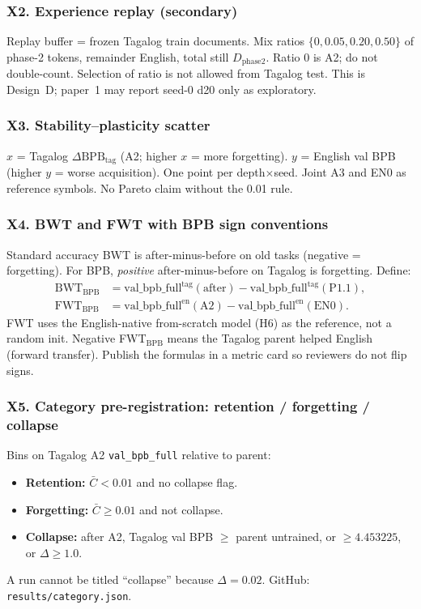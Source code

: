 \documentclass[11pt,a4paper]{article}
\begin{document}
\subsubsection*{X2. Experience replay (secondary)}
Replay buffer = frozen Tagalog train documents. Mix ratios $\{0,0.05,0.20,0.50\}$ of phase-2 tokens, remainder English, total still $D_{\mathrm{phase2}}$. Ratio $0$ is A2; do not double-count. Selection of ratio is not allowed from Tagalog test. This is Design~D; paper~1 may report seed-0 d20 only as exploratory.

\subsubsection*{X3. Stability--plasticity scatter}
$x$ = Tagalog $\Delta\mathrm{BPB}_{\mathrm{tag}}$ (A2; higher $x$ = more forgetting). $y$ = English val BPB (higher $y$ = worse acquisition). One point per depth$\times$seed. Joint A3 and EN0 as reference symbols. No Pareto claim without the 0.01 rule.

\subsubsection*{X4. BWT and FWT with BPB sign conventions}
Standard accuracy BWT is after-minus-before on old tasks (negative = forgetting). For BPB, \emph{positive} after-minus-before on Tagalog is forgetting. Define:
\begin{align*}
\mathrm{BWT}_{\mathrm{BPB}} &= \mathrm{val\_bpb\_full}^{\mathrm{tag}}(\mathrm{after})-\mathrm{val\_bpb\_full}^{\mathrm{tag}}(\mathrm{P1.1}),\\
\mathrm{FWT}_{\mathrm{BPB}} &= \mathrm{val\_bpb\_full}^{\mathrm{en}}(\mathrm{A2})-\mathrm{val\_bpb\_full}^{\mathrm{en}}(\mathrm{EN0}).
\end{align*}
FWT uses the English-native from-scratch model (H6) as the reference, not a random init. Negative FWT$_{\mathrm{BPB}}$ means the Tagalog parent helped English (forward transfer). Publish the formulas in a metric card so reviewers do not flip signs.

\subsubsection*{X5. Category pre-registration: retention / forgetting / collapse}
Bins on Tagalog A2 \texttt{val\_bpb\_full} relative to parent:
\begin{itemize}
\item \textbf{Retention:} $\bar C < 0.01$ and no collapse flag.
\item \textbf{Forgetting:} $\bar C \ge 0.01$ and not collapse.
\item \textbf{Collapse:} after A2, Tagalog val BPB $\ge$ parent untrained, or $\ge 4.453225$, or $\Delta\ge 1.0$.
\end{itemize}
A run cannot be titled ``collapse'' because $\Delta=0.02$. GitHub: \texttt{results/category.json}.
\end{document}
